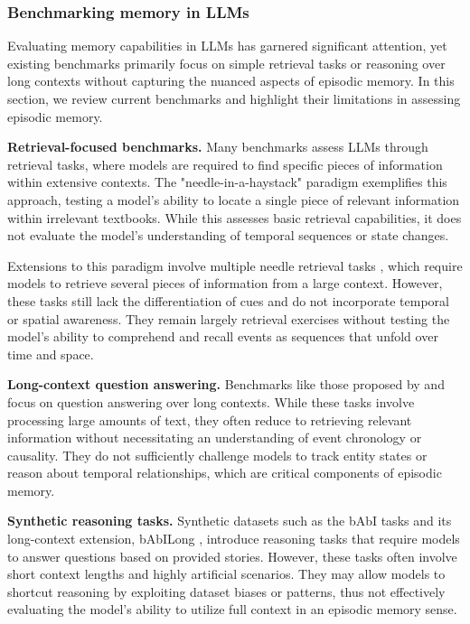 \documentclass{article}
\begin{document}
\subsubsection{Benchmarking memory in LLMs}

Evaluating memory capabilities in LLMs has garnered significant attention, yet existing benchmarks primarily focus on simple retrieval tasks or reasoning over long contexts without capturing the nuanced aspects of episodic memory. In this section, we review current benchmarks and highlight their limitations in assessing episodic memory.

\noindent \textbf{Retrieval-focused benchmarks.}
Many benchmarks assess LLMs through retrieval tasks, where models are required to find specific pieces of information within extensive contexts. The "needle-in-a-haystack" paradigm \citep{Kamradt2023} exemplifies this approach, testing a model's ability to locate a single piece of relevant information within irrelevant textbooks. While this assesses basic retrieval capabilities, it does not evaluate the model's understanding of temporal sequences or state changes.

Extensions to this paradigm involve multiple needle retrieval tasks \citep{reid2024gemini, Hsieh2024, Li2024, Zhang2024Bench}, which require models to retrieve several pieces of information from a large context. However, these tasks still lack the differentiation of cues and do not incorporate temporal or spatial awareness. They remain largely retrieval exercises without testing the model's ability to comprehend and recall events as sequences that unfold over time and space.

\noindent \textbf{Long-context question answering.}
Benchmarks like those proposed by \citep{bohnet2024long} and \citep{Zhang2024Bench} focus on question answering over long contexts. While these tasks involve processing large amounts of text, they often reduce to retrieving relevant information without necessitating an understanding of event chronology or causality. They do not sufficiently challenge models to track entity states or reason about temporal relationships, which are critical components of episodic memory.

\noindent \textbf{Synthetic reasoning tasks.}
Synthetic datasets such as the bAbI tasks \citep{weston2015towards_babi} and its long-context extension, bAbILong \citep{kuratov2024babilong}, introduce reasoning tasks that require models to answer questions based on provided stories. However, these tasks often involve short context lengths and highly artificial scenarios. They may allow models to shortcut reasoning by exploiting dataset biases or patterns, thus not effectively evaluating the model's ability to utilize full context in an episodic memory sense.
\end{document}
